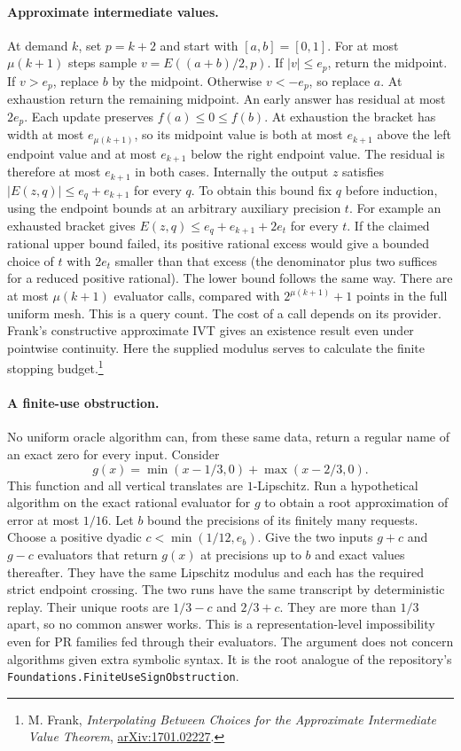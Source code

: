 \paragraph{Approximate intermediate values.}
At demand $k$, set $p=k+2$ and start with $[a,b]=[0,1]$. For at most
$\mu(k+1)$ steps sample $v=E((a+b)/2,p)$. If $|v|\le e_p$, return
the midpoint. If $v>e_p$, replace $b$ by the midpoint. Otherwise
$v<-e_p$, so replace $a$. At exhaustion return the remaining midpoint.
An early answer has residual at most $2e_p$. Each update preserves
$f(a)\le0\le f(b)$. At exhaustion the bracket has width at most
$e_{\mu(k+1)}$, so its midpoint value is both at most $e_{k+1}$ above
the left endpoint value and at most $e_{k+1}$ below the right endpoint
value. The residual is therefore at most $e_{k+1}$ in both cases.
Internally the output $z$ satisfies
$|E(z,q)|\le e_q+e_{k+1}$ for every $q$. To obtain this bound fix $q$ before induction,
using the endpoint bounds at an arbitrary auxiliary precision $t$.
For example an exhausted bracket gives
$E(z,q)\le e_q+e_{k+1}+2e_t$ for every $t$. If the claimed rational
upper bound failed, its positive rational excess would give a bounded
choice of $t$ with $2e_t$ smaller than that excess (the denominator
plus two suffices for a reduced positive rational). The lower bound
follows the same way. There are at most
$\mu(k+1)$ evaluator calls, compared with $2^{\mu(k+1)}+1$ points in
the full uniform mesh. This is a query count. The cost of a call depends
on its provider. Frank's constructive approximate IVT gives an existence
result even under pointwise continuity. Here the supplied modulus serves
to calculate the finite stopping budget.\footnote{M. Frank,
\emph{Interpolating Between Choices for the Approximate Intermediate
Value Theorem}, \href{https://arxiv.org/abs/1701.02227}{arXiv:1701.02227}.}

\paragraph{A finite-use obstruction.}
No uniform oracle algorithm can, from these same data, return a regular
name of an exact zero for every input. Consider
\[
 g(x)=\min(x-1/3,0)+\max(x-2/3,0).
\]
This function and all vertical translates are $1$-Lipschitz. Run a
hypothetical algorithm on the exact rational evaluator for $g$ to obtain
a root approximation of error at most $1/16$. Let $b$ bound the
precisions of its finitely many requests. Choose a positive dyadic
$c<\min(1/12,e_b)$. Give the two inputs $g+c$ and $g-c$ evaluators
that return $g(x)$ at precisions up to $b$ and exact values thereafter.
They have the same Lipschitz modulus and each has the required strict
endpoint crossing. The two runs have the same transcript by deterministic
replay. Their unique roots are $1/3-c$ and $2/3+c$. They are more than
$1/3$ apart, so no common answer works. This is a representation-level
impossibility even for PR families fed through their evaluators. The
argument does not concern algorithms given extra symbolic syntax. It is
the root analogue of the repository's
\texttt{Foundations.FiniteUseSignObstruction}.

